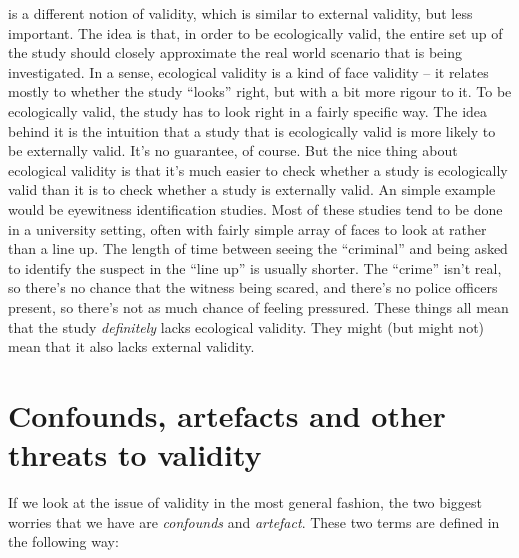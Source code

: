 
 is a different notion of validity, which is similar to external validity, but less important. The idea is that, in order to be ecologically valid, the entire set up of the study should closely approximate the real world scenario that is being investigated. In a sense, ecological validity is a kind of face validity -- it relates mostly to whether the study ``looks'' right, but with a bit more rigour to it. To be ecologically valid, the study has to look right in a fairly specific way. The idea behind it is the intuition that a study that is ecologically valid is more likely to be externally valid. It's no guarantee, of course. But the nice thing about ecological validity is that it's much easier to check whether a study is ecologically valid than it is to check whether a study is externally valid. An simple example would be eyewitness identification studies. Most of these studies tend to be done in a university setting, often with fairly simple array of faces to look at rather than a line up. The length of time between seeing the ``criminal'' and being asked to identify the suspect in the ``line up'' is usually shorter. The ``crime'' isn't real, so there's no chance that the witness being scared, and there's no police officers present, so there's not as much chance of feeling pressured. These things all mean that the study {\it definitely} lacks ecological validity. They might (but might not) mean that it also lacks external validity.



\section{Confounds, artefacts and other threats to validity}

If we look at the issue of validity in the most general fashion, the two biggest worries that we have are {\it confounds} and {\it artefact}. These two terms are defined in the following way:


